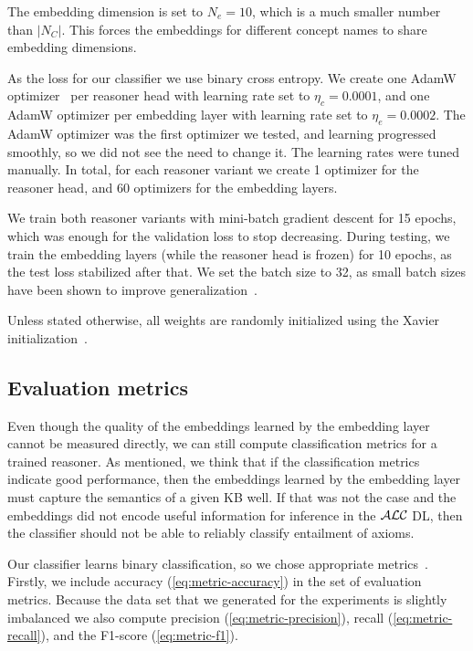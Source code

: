 The embedding dimension is set to $N_e = 10$, which is a much smaller number than $|N_C|$.
This forces the embeddings for different concept names to share embedding dimensions.

As the loss for our classifier we use binary cross entropy.
We create one AdamW optimizer~\cite{loshchilov_decoupled_2019} per reasoner head with learning rate set to $\eta_c = 0.0001$, and one AdamW optimizer per embedding layer with learning rate set to $\eta_e = 0.0002$.
The AdamW optimizer was the first optimizer we tested, and learning progressed smoothly, so we did not see the need to change it.
The learning rates were tuned manually.
In total, for each reasoner variant we create 1 optimizer for the reasoner head, and 60 optimizers for the embedding layers. 

We train both reasoner variants with mini-batch gradient descent for 15 epochs, which was enough for the validation loss to stop decreasing.
During testing, we train the embedding layers (while the reasoner head is frozen) for 10 epochs, as the test loss stabilized after that.
We set the batch size to 32, as small batch sizes have been shown to improve generalization~\cite{masters_revisiting_2018}. 

Unless stated otherwise, all weights are randomly initialized using the Xavier initialization~\cite{glorot_understanding_2010}.

\subsection{Evaluation metrics}

Even though the quality of the embeddings learned by the embedding layer cannot be measured directly, we can still compute classification metrics for a trained reasoner.
As mentioned, we think that if the classification metrics indicate good performance, then the embeddings learned by the embedding layer must capture the semantics of a given KB well.
If that was not the case and the embeddings did not encode useful information for inference in the $\mathcal{ALC}$ DL, then the classifier should not be able to reliably classify entailment of axioms.

Our classifier learns binary classification, so we chose appropriate metrics~\cite{tharwat_classification_2021}.
Firstly, we include accuracy (\autoref{eq:metric-accuracy}) in the set of evaluation metrics.
Because the data set that we generated for the experiments is slightly imbalanced we also compute precision (\autoref{eq:metric-precision}), recall (\autoref{eq:metric-recall}), and the F1-score (\autoref{eq:metric-f1}). 

